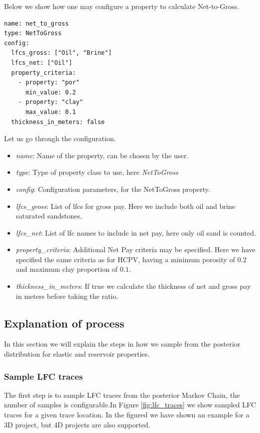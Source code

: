\documentclass[note,screen,english,12pt,utf8]{nrdoc}
\begin{document}
Below we show how one may configure a property to calculate Net-to-Gross.
\begin{verbatim}
name: net_to_gross
type: NetToGross
config:
  lfcs_gross: ["Oil", "Brine"]
  lfcs_net: ["Oil"]
  property_criteria:
    - property: "por"
      min_value: 0.2
    - property: "clay"
      max_value: 0.1
  thickness_in_meters: false
\end{verbatim}

Let us go through the configuration.
\begin{itemize}
    \item \emph{name}: Name of the property, can be chosen by the user.
    \item{\emph{type}: Type of property class to use, here \emph{NetToGross}}
    \item \emph{config}: Configuration parameters, for the NetToGross property.
    \item \emph{lfcs\_gross}: List of lfcs for gross pay. Here we include both oil and brine saturated sandstones.
    \item \emph{lfcs\_net}: List of lfc names to include in net pay, here only oil sand is counted.
    \item {
        \emph{property\_criteria}: Additional Net Pay criteria may be
        specified. Here we have specified the same criteria as for HCPV,
        having a minimum porosity of $0.2$ and maximum clay proportion of $0.1$.
    }
    \item {
        \emph{thickness\_in\_meters}: If true we calculate the thickness of net and gross
        pay in meters before taking the ratio.
    }
\end{itemize}


\subsection{Explanation of process}

In this section we will explain the steps in how we sample from the
posterior distribution for elastic and reservoir properties.

\subsubsection{Sample LFC traces}

The first step is to sample LFC traces from the posterior Markov Chain, the
number of samples is configurable.In Figure \ref{fig:lfc_traces} we show
sampled LFC traces for a given trace location. In the figured we have shown
an example for a 3D project, but 4D projects are also supported.
\end{document}
